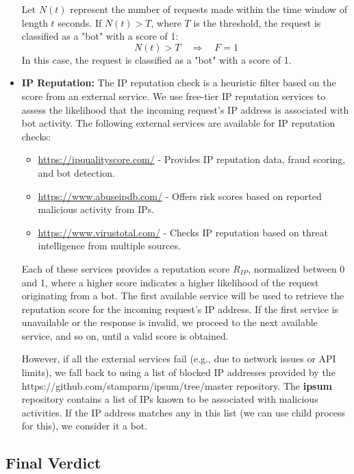 \documentclass[12pt,a4paper]{article}
\begin{document}
\begin{itemize}
  Let \(N(t)\) represent the number of requests made within the time window of length \(t\) seconds. If \( N(t) > T \), where \(T\) is the threshold, the request is classified as a "bot" with a score of 1:
  \[
  N(t) > T \quad \Rightarrow \quad F = 1
  \]
  In this case, the request is classified as a "bot" with a score of 1.

\item \textbf{IP Reputation:} 
  The IP reputation check is a heuristic filter based on the score from an external service. We use free-tier IP reputation services to assess the likelihood that the incoming request’s IP address is associated with bot activity. The following external services are available for IP reputation checks:
  \begin{itemize}
    \item \url{https://ipqualityscore.com/} - Provides IP reputation data, fraud scoring, and bot detection.
    \item \url{https://www.abuseipdb.com/} - Offers risk scores based on reported malicious activity from IPs.
    \item \url{https://www.virustotal.com/} - Checks IP reputation based on threat intelligence from multiple sources.
  \end{itemize}
  
  Each of these services provides a reputation score \( R_{IP} \), normalized between 0 and 1, where a higher score indicates a higher likelihood of the request originating from a bot. The first available service will be used to retrieve the reputation score for the incoming request’s IP address. If the first service is unavailable or the response is invalid, we proceed to the next available service, and so on, until a valid score is obtained.

  However, if all the external services fail (e.g., due to network issues or API limits), we fall back to using a list of blocked IP addresses provided by the https://github.com/stamparm/ipsum/tree/master repository. The \textbf{ipsum} repository contains a list of IPs known to be associated with malicious activities. If the IP address matches any in this list (we can use child process for this), we consider it a bot.

\end{itemize}

\subsection{Final Verdict}
\end{document}
